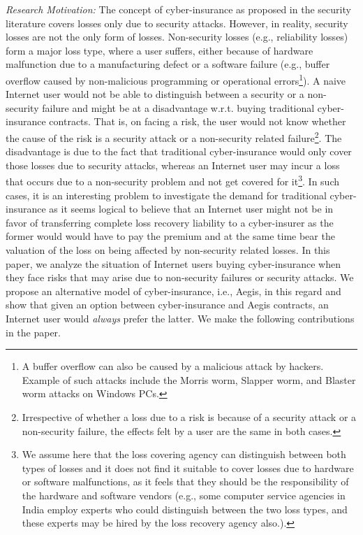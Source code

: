 \documentclass[letterpaper,12pt, onecolumn, nodraft]{IEEEtran}
\begin{document}
\emph{Research Motivation:} The concept of cyber-insurance as proposed in the security literature covers losses only due to security attacks. However, in reality, security losses are not the only form of losses. Non-security losses (e.g., reliability losses) form a major loss type, where a user suffers, either because of hardware malfunction due to a manufacturing defect or a software failure (e.g., buffer overflow caused by non-malicious programming or operational errors\footnote{A buffer overflow can also be caused by a malicious attack by hackers. Example of such attacks include the Morris worm, Slapper worm, and Blaster worm attacks on Windows PCs.})\cite{hs-security}. A naive Internet user would not be able to distinguish between a security or a non-security failure and might be at a disadvantage w.r.t. buying traditional cyber-insurance contracts. That is, on facing a risk, the user would not know whether the cause of the risk is a security attack or a non-security related failure\footnote{Irrespective of whether a loss due to a risk is because of a security attack or a non-security failure, the effects felt by a user are the same in both cases.}. The disadvantage is due to the fact that traditional cyber-insurance would only cover those losses due to security attacks, whereas an Internet user may incur a loss that occurs due to a non-security problem and not get covered for it\footnote{We assume here that the loss covering agency can distinguish between both types of losses and it does not find it suitable to cover losses due to hardware or software malfunctions, as it feels that they should be the responsibility of the hardware and software vendors (e.g., some computer service agencies in India employ experts who could distinguish between the two loss types, and these experts may be hired by the loss recovery agency also.).}. In such cases, it is an interesting problem to investigate the demand for traditional cyber-insurance as it seems logical to believe that an Internet user might not be in favor of transferring complete loss recovery liability to a cyber-insurer as the former would would have to pay the premium and at the same time bear the valuation of the loss on being affected by non-security related losses.  In this paper, we analyze the situation of Internet users buying cyber-insurance when they face risks that may arise due to non-security failures or security attacks. We propose an alternative model of cyber-insurance, i.e., Aegis, in this regard and show that given an option between cyber-insurance and Aegis contracts, an Internet user would \emph{always} prefer the latter. We make the following contributions in the paper. 
\end{document}
